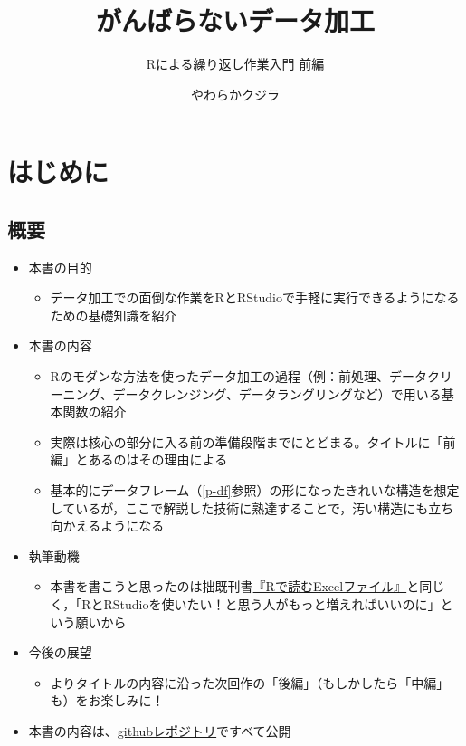 \documentclass[
  xelatex,ja=standard, b5paper]{bxjsbook}
\title{がんばらないデータ加工}
\subtitle{Rによる繰り返し作業入門 前編}
\author{やわらかクジラ}
\date{}
\providecommand{\tightlist}{%
  \setlength{\itemsep}{0pt}\setlength{\parskip}{0pt}}
\begin{document}
\maketitle

{
\setcounter{tocdepth}{1}
\tableofcontents
}
\hypertarget{hajimeni}{%
\chapter*{はじめに}\label{hajimeni}}

\hypertarget{ux6982ux8981}{%
\section*{概要}\label{ux6982ux8981}}

\begin{itemize}
\tightlist
\item
  本書の目的

  \begin{itemize}
  \tightlist
  \item
    データ加工での面倒な作業をRとRStudioで手軽に実行できるようになるための基礎知識を紹介
  \end{itemize}
\item
  本書の内容

  \begin{itemize}
  \tightlist
  \item
    Rのモダンな方法を使ったデータ加工の過程（例：前処理、データクリーニング、データクレンジング、データラングリングなど）で用いる基本関数の紹介
  \item
    実際は核心の部分に入る前の準備段階までにとどまる。タイトルに「前編」とあるのはその理由による
  \item
    基本的にデータフレーム（\ref{p-df}参照）の形になったきれいな構造を想定しているが，ここで解説した技術に熟達することで，汚い構造にも立ち向かえるようになる
  \end{itemize}
\item
  執筆動機

  \begin{itemize}
  \tightlist
  \item
    本書を書こうと思ったのは拙既刊書\href{https://techbookfest.org/product/4794168259903488?productVariantID=5913872206659584}{『Rで読むExcelファイル』}と同じく，「RとRStudioを使いたい！と思う人がもっと増えればいいのに」という願いから
  \end{itemize}
\item
  今後の展望

  \begin{itemize}
  \tightlist
  \item
    よりタイトルの内容に沿った次回作の「後編」（もしかしたら「中編」も）をお楽しみに！
  \end{itemize}
\item
  本書の内容は、\href{https://github.com/izunyan/gisho12}{githubレポジトリ}ですべて公開
\end{itemize}
\end{document}
